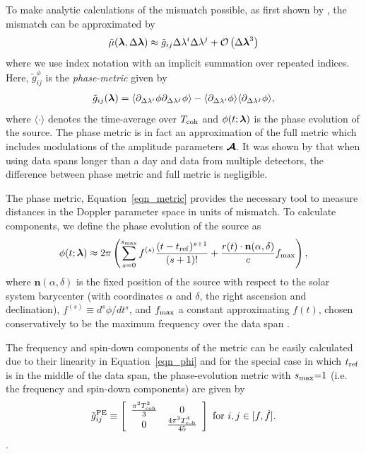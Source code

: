 \documentclass[aps, prd, twocolumn, superscriptaddress, floatfix, showpacs, nofootinbib, longbibliography]{revtex4-1}
\begin{document}
To make analytic calculations of the mismatch possible, as first shown by
\citet{brady1998}, the mismatch can be approximated by
\begin{equation}
\tilde{\mu}(\boldsymbol{\mathbf{\lambda}}, \Delta\boldsymbol{\mathbf{\lambda}}) \approx
\tilde{g}_{ij}\Delta\lambda^{i}\Delta\lambda^{j}
+ \mathcal{O}\left(\Delta\boldsymbol{\mathbf{\lambda}}^{3}\right)
\label{eqn_mutilde_expansion}
\end{equation}
where we use index notation with an implicit summation over repeated indices.
Here, $\tilde{g}_{ij}^{\phi}$ is the \emph{phase-metric} given by
\begin{align}
\tilde{g}_{ij}(\boldsymbol{\mathbf{\lambda}}) =
\langle
\partial_{\Delta\lambda^{i}}\phi
\partial_{\Delta\lambda^{j}}\phi
\rangle
-
\langle
\partial_{\Delta\lambda^{i}}\phi
\rangle
\langle
\partial_{\Delta\lambda^{j}}\phi
\rangle,
\label{eqn_metric}
\end{align}
where $\langle \cdot \rangle$ denotes the time-average over $T_{\rm coh}$ and
$\phi(t; \boldsymbol{\mathbf{\lambda}})$ is the phase evolution of the source. The phase metric is
in fact an approximation of the full metric which includes modulations of the
amplitude parameters $\boldsymbol{\mathcal{A}}$. It was shown by \citet{prix2007metric} that
when using data spans longer than a day and data from multiple detectors, the
difference between phase metric and full metric is negligible.

The phase metric, Equation~\eqref{eqn_metric} provides the necessary tool to
measure distances in the Doppler parameter space in units of mismatch. To
calculate components, we define the phase evolution
of the source as \citep{wette2015}
\begin{align}
\phi(t; \boldsymbol{\mathbf{\lambda}}) \approx 2\pi\left(
\sum_{s=0}^{s_{\textrm{max}}} f^{(s)}\frac{(t-t_{\rm ref})^{s+1}}{(s+1)!}
+ \frac{r(t)\cdot\mathbf{n}(\alpha, \delta)}{c} f_{\textrm{max}}\right),
\label{eqn_phi}
\end{align}
where $\mathbf{n}(\alpha, \delta)$ is the fixed position of the source with
respect to the solar system barycenter (with coordinates $\alpha$ and $\delta$,
the right ascension and declination), $f^{(s)}\equiv d^{s}\phi/dt^s$, and
$f_{\textrm{max}}$ a constant approximating $f(t)$, chosen conservatively to be the
maximum frequency over the data span \citep{wette2013}.

The frequency and spin-down components of the metric can be easily calculated
due to their linearity in Equation~\eqref{eqn_phi} and for the special case in
which $t_{\rm ref}$ is in the middle of the data span, the phase-evolution metric
with $s_{\textrm{max}}{=}1$ (i.e. the frequency and spin-down components) are given by
\begin{equation}
\tilde{g}^{\textrm{PE}}_{ij} \equiv
\left[
\begin{array}{cc}
\frac{\pi^{2}T_{\rm coh}^{2}}{3} & 0 \\
0 & \frac{4\pi^{2}T_{\rm coh}^{4}}{45}
\end{array}
\right]
\textrm{ for } i, j \in [f, \dot{f}].
\end{equation}.
\end{document}
